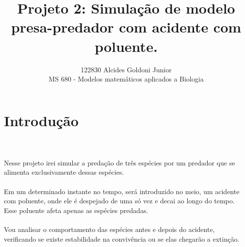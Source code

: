 \documentclass[a4paper]{article}
\title{Projeto 2: Simula\c{c}\~ao de modelo presa-predador com acidente com poluente.}
\author{122830 Alcides Goldoni Junior\\
  \small MS 680 - Modelos matem\'{a}ticos aplicados a Biologia\\
}%
\begin{document}
\maketitle
\section{Introdu\c{c}\~{a}o}
\\
\\
Nesse projeto irei simular a preda\c{c}\~ao de tr\^es esp\'ecies por um predador que se alimenta exclusivamente dessas esp\'ecies.
\\
\\
Em um determinado instante no tempo, ser\'a introduzido no meio, um acidente com poluente, onde ele \'e despejado de uma s\'o vez e decai ao longo do tempo. Esse poluente afeta apenas as esp\'ecies predadas.
\\
\\
Vou analisar o comportamento das esp\'ecies antes e depois do acidente, verificando se existe estabilidade na conviv\^encia ou se elas chegar\~ao a extin\c{c}\~ao.
\\
\\
\end{document}
